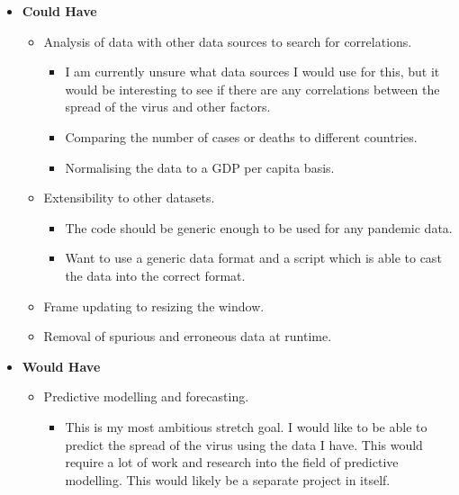 \documentclass{report}
\begin{document}
\begin{itemize}
\begin{itemize}
    \end{itemize}
    \item \textbf{\Large{Could Have}}
    \begin{itemize}
        \item Analysis of data with other data sources to search for correlations.
        \begin{itemize}
            \item I am currently unsure what data sources I would use for this, but it would be interesting to see if there are any correlations between the spread of the virus and other factors.
            \item Comparing the number of cases or deaths to different countries.
            \item Normalising the data to a GDP per capita basis.
        \end{itemize}
        \item Extensibility to other datasets.
        \begin{itemize}
            \item The code should be generic enough to be used for any pandemic data.
            \item Want to use a generic data format and a script which is able to cast the data into the correct format.
        \end{itemize}
        \item Frame updating to resizing the window.
        \item Removal of spurious and erroneous data at runtime.
    \end{itemize}
    \item \textbf{\Large{Would Have}}
    \begin{itemize}
        \item Predictive modelling and forecasting.
        \begin{itemize}
            \item This is my most ambitious stretch goal. I would like to be able to predict the spread of the virus using the data I have. This would require a lot of work and research into the field of predictive modelling. This would likely be a separate project in itself.
        \end{itemize}
    \end{itemize}
\end{itemize}
\newpage
\end{document}
